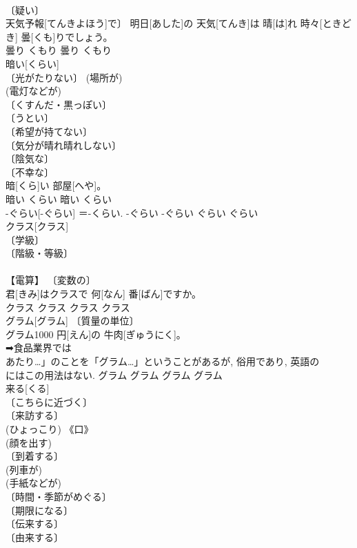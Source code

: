 \documentclass[8pt]{extreport}
\begin{document}
\begin{CJK}{UTF8}{min}
\\	〔疑い〕 
\\	天気予報[てんきよほう]で〕 明日[あした]の 天気[てんき]は 晴[は]れ 時々[ときどき] 曇[くも]りでしょう。	
\\	曇り	くもり	曇り	くもり	
\\	暗い[くらい]	
\\	〔光がたりない〕 (場所が) 
\\	(電灯などが) 
\\	〔くすんだ・黒っぽい〕 
\\	〔うとい〕 
\\	〔希望が持てない〕 
\\	〔気分が晴れ晴れしない〕 
\\	〔陰気な〕 
\\	〔不幸な〕 
\\	暗[くら]い 部屋[へや]。	
\\	暗い	くらい	暗い	くらい	
\\	-ぐらい[-ぐらい]	＝-くらい.			-ぐらい	-ぐらい	ぐらい	ぐらい	
\\	クラス[クラス]	
\\	〔学級〕 
\\	〔階級・等級〕 
\\	[⇒きゅう８] 
\\	【電算】 〔変数の〕 
\\	君[きみ]はクラスで 何[なん] 番[ばん]ですか。	
\\	クラス	クラス	クラス	クラス	
\\	グラム[グラム]	〔質量の単位〕 
\\	グラム1000 円[えん]の 牛肉[ぎゅうにく]。	
\\	➡食品業界では
\\	あたり…」のことを「グラム…」ということがあるが, 俗用であり, 英語の 
\\	にはこの用法はない.	グラム	グラム	グラム	グラム	
\\	来る[くる]	
\\	〔こちらに近づく〕 
\\	〔来訪する〕 
\\	(ひょっこり) 《口》 
\\	(顔を出す) 
\\	〔到着する〕 
\\	(列車が) 
\\	(手紙などが) 
\\	〔時間・季節がめぐる〕 
\\	〔期限になる〕 
\\	〔伝来する〕 
\\	〔由来する〕 

\end{CJK}
\end{document}
